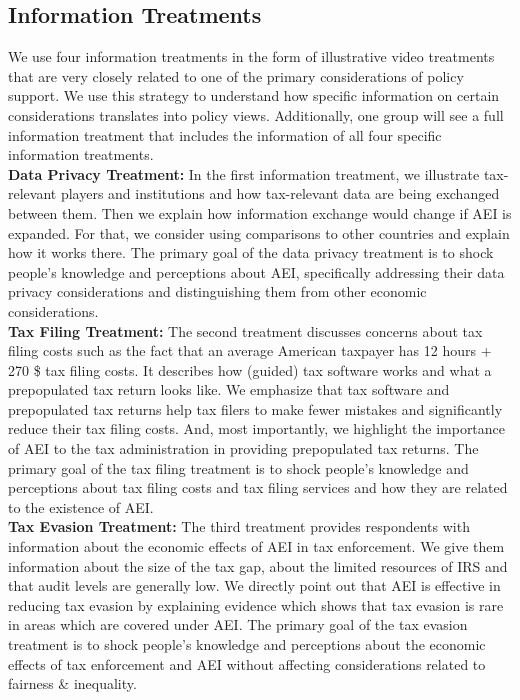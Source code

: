 \documentclass[11pt]{article}
\begin{document}
\subsection{Information Treatments}
We use four information treatments in the form of illustrative video treatments that are very closely related to one of the primary considerations of policy support. We use this strategy to understand how specific information on certain considerations translates into policy views. Additionally, one group will see a full information treatment that includes the information of all four specific information treatments. \\[0.5em]
\textbf{Data Privacy Treatment:}
In the first information treatment, we illustrate tax-relevant players and institutions and how tax-relevant data are being exchanged between them. Then we explain how information exchange would change if AEI is expanded. For that, we consider using comparisons to other countries and explain how it works there. The primary goal of the data privacy treatment is to shock people’s knowledge and perceptions about AEI, specifically addressing their data privacy considerations and distinguishing them from other economic considerations. \\[0.5em]
\textbf{Tax Filing Treatment:}
The second treatment discusses concerns about tax filing costs such as the fact that an average American taxpayer has 12 hours + 270 \$ tax filing costs. It describes how (guided) tax software works and what a prepopulated tax return looks like. We emphasize that tax software and prepopulated tax returns help tax filers to make fewer mistakes and significantly reduce their tax filing costs. And, most importantly, we highlight the importance of AEI to the tax administration in providing prepopulated tax returns. The primary goal of the tax filing treatment is to shock people's knowledge and perceptions about tax filing costs and tax filing services and how they are related to the existence of AEI. \\[0.5em]  
\textbf{Tax Evasion Treatment:}
The third treatment provides respondents with information about the economic effects of AEI in tax enforcement. We give them information about the size of the tax gap, about the limited resources of IRS and that audit levels are generally low. We directly point out that AEI is effective in reducing tax evasion by explaining evidence which shows that tax evasion is rare in areas which are covered under AEI. The primary goal of the tax evasion treatment is to shock people’s knowledge and perceptions about the economic effects of tax enforcement and AEI without affecting considerations related to fairness \& inequality. \\[0.5em]
\end{document}
